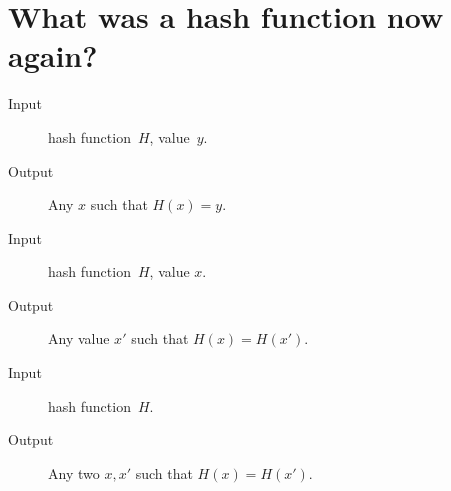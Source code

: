 \mode*

\section[Hash functions]{What was a hash function now again?}


\begin{frame}
  \begin{definition}
    \begin{description}
      \item[Input] hash function~\(H\), value~\(y\).
      \item[Output] Any \(x\) such that \(H(x) = y\).
    \end{description}
  \end{definition}

  \begin{definition}
    \begin{description}
      \item[Input] hash function~\(H\), value \(x\).
      \item[Output] Any value \(x'\) such that \(H(x) = H(x')\).
    \end{description}
  \end{definition}

  \begin{definition}
    \begin{description}
      \item[Input] hash function~\(H\).
      \item[Output] Any two \(x, x'\) such that \(H(x) = H(x')\).
    \end{description}
  \end{definition}
\end{frame}


